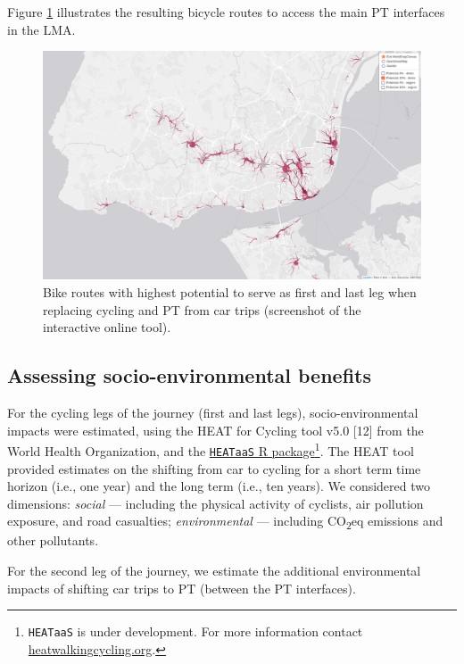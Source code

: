 \documentclass[runningheads]{llncs}
\begin{document}
Figure \ref{fig:map2} illustrates the resulting bicycle routes to access
the main PT interfaces in the LMA.

\begin{figure}

{\centering \includegraphics[width=0.8\linewidth,]{img/map2} 

}

\caption{Bike routes with highest potential to serve as first and last leg when replacing cycling and PT from car trips (screenshot of the interactive online tool).}\label{fig:map2}
\end{figure}

\hypertarget{assessing-socio-environmental-benefits}{%
\subsection{Assessing socio-environmental
benefits}\label{assessing-socio-environmental-benefits}}

For the cycling legs of the journey (first and last legs),
socio-environmental impacts were estimated, using the HEAT for Cycling
tool v5.0 {[}12{]} from the World Health Organization, and the
\href{https://github.com/HEAT-WHO/HEAT_heatr_api}{\texttt{HEATaaS} R
package}\footnote{\texttt{HEATaaS} is under development. For more
  information contact
  \href{https://heatwalkingcycling.org}{heatwalkingcycling.org}.}. The
HEAT tool provided estimates on the shifting from car to cycling for a
short term time horizon (i.e., one year) and the long term (i.e., ten
years). We considered two dimensions: \emph{social} --- including the
physical activity of cyclists, air pollution exposure, and road
casualties; \emph{environmental} --- including CO\textsubscript{2}eq
emissions and other pollutants.

For the second leg of the journey, we estimate the additional
environmental impacts of shifting car trips to PT (between the PT
interfaces).
\end{document}
